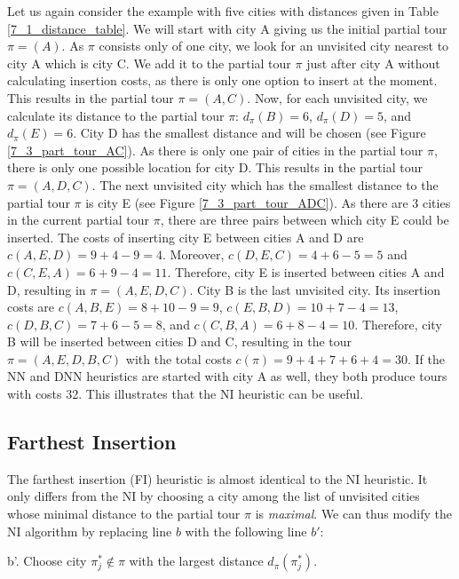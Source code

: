 Let us again consider the example with five cities with distances given in Table \ref{7_1_distance_table}. We will start with city A giving us the initial partial tour $\pi =  ( A )$. As $\pi$ consists only of one city, we look for an unvisited city nearest to city A which is city C. We add it to the partial tour $\pi$ just after city A without calculating insertion costs, as there is only one option to insert at the moment. This results in the partial tour $\pi = (A, C)$. Now, for each unvisited city, we calculate its distance to the partial tour $\pi$: $d_{\pi}(B) = 6$, $d_{\pi}(D) = 5$, and $d_{\pi}(E) = 6$. City D has the smallest distance and will be chosen (see Figure \ref{7_3_part_tour_AC}). As there is only one pair of cities in the partial tour $\pi$, there is only one possible location for city D. This results in the partial tour $\pi = (A, D, C)$. The next unvisited city which has the smallest distance to the partial tour $\pi$ is city E (see Figure \ref{7_3_part_tour_ADC}). As there are 3 cities in the current partial tour $\pi$, there are three pairs between which city E could be inserted. The costs of inserting city E between cities A and D are $c(A, E, D) = 9 + 4 - 9 = 4$. Moreover, $c(D, E, C) = 4 + 6 - 5 = 5$ and $c(C, E, A) = 6 + 9 - 4 = 11$. Therefore, city E is inserted between cities A and D, resulting in $\pi = (A, E, D, C)$. City B is the last unvisited city. Its insertion costs are $c(A, B, E) = 8 + 10 - 9 = 9$, $c(E, B, D) = 10 + 7 - 4 = 13$, $c(D, B, C) = 7 + 6 - 5 = 8$, and $c(C, B, A) = 6 + 8 - 4 = 10$. Therefore, city B will be inserted between cities D and C, resulting in the tour $\pi = (A, E, D, B, C)$ with the total costs $c(\pi) = 9 + 4 + 7 + 6 + 4 = 30$. If the NN and DNN heuristics are started with city A as well, they both produce tours with costs 32. This illustrates that the NI heuristic can be useful.


\subsection{Farthest Insertion}
\label{subsec:fi}

The farthest insertion (FI) heuristic is almost identical to the NI heuristic. It only differs from the NI by choosing a city among the list of unvisited cities whose minimal distance to the partial tour $\pi$ is \textit{maximal}. We can thus modify the NI algorithm by replacing line $b$ with the following line $b'$:

b'. Choose city $\pi_{j}^{*}\notin \pi$ with the largest distance $d_{\pi}(\pi_{j}^{*})$.

